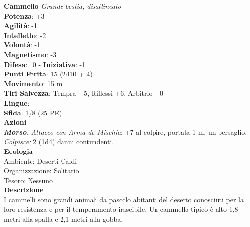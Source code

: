 \begin{multicols}{2}
\medskip\textbf{Cammello}
\emph{Grande bestia, disallineato}\\
\textbf{Potenza}: +3\\
\textbf{Agilità}: -1\\
\textbf{Intelletto}: -2\\
\textbf{Volontà}: -1\\
\textbf{Magnetismo}: -3\\
\textbf{Difesa}: 10 - \textbf{Iniziativa}: -1\\
\textbf{Punti Ferita}: 15 (2d10 + 4)\\
\textbf{Movimento}: 15 m\\
\textbf{Tiri Salvezza}: Tempra +5, Riflessi +6, Arbitrio +0 \\
\textbf{Lingue}: -\\
\textbf{Sfida}: 1/8 (25 PE)\smallskip\\
\smallskip\textbf{Azioni}\\
\emph{\textbf{Morso.} Attacco con Arma da Mischia}: +7 al colpire, portata 1 m, un bersaglio.\\
\emph{Colpisce:} 2 (1d4) danni contundenti.\\
\textbf{Ecologia}\\
Ambiente: Deserti Caldi\\
Organizzazione: Solitario\\
Tesoro: Nessuno\\
\textbf{Descrizione}\\
I cammelli sono grandi animali da pascolo abitanti del deserto conosciuti per la loro resistenza e per il temperamento irascibile. Un cammello tipico è alto 1,8 metri alla spalla e 2,1 metri alla gobba. \\


\end{multicols}
